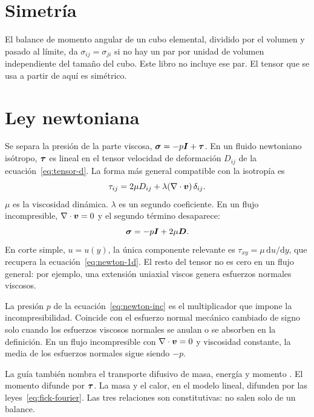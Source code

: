 \section{Simetría}

El balance de momento angular de un cubo elemental, dividido por el volumen y pasado al límite, da \(\sigma_{ij}=\sigma_{ji}\) si no hay un par por unidad de volumen independiente del tamaño del cubo. Este libro no incluye ese par. El tensor que se usa a partir de aquí es simétrico.

\section{Ley newtoniana}

Se separa la presión de la parte viscosa, \(\boldsymbol{\sigma}=-p\boldsymbol{I}+\boldsymbol{\tau}\). En un fluido newtoniano isótropo, \(\boldsymbol{\tau}\) es lineal en el tensor velocidad de deformación \(D_{ij}\) de la ecuación~\eqref{eq:tensor-d}. La forma más general compatible con la isotropía es
\begin{equation}
\label{eq:newtoniano}
\tau_{ij}=2\mu D_{ij}+\lambda (\nabla\cdot\boldsymbol{v})\,\delta_{ij}.
\end{equation}
\(\mu\) es la viscosidad dinámica. \(\lambda\) es un segundo coeficiente. En un flujo incompresible, \(\nabla\cdot\boldsymbol{v}=0\) y el segundo término desaparece:
\begin{equation}
\label{eq:newton-inc}
\boldsymbol{\sigma}=-p\boldsymbol{I}+2\mu\boldsymbol{D}.
\end{equation}
 En corte simple, \(u=u(y)\), la única componente relevante es \(\tau_{xy}=\mu\,\mathrm{d}u/\mathrm{d}y\), que recupera la ecuación~\eqref{eq:newton-1d}. El resto del tensor no es cero en un flujo general: por ejemplo, una extensión uniaxial viscos genera esfuerzos normales viscosos.

\begin{warningbox}
La presión \(p\) de la ecuación~\eqref{eq:newton-inc} es el multiplicador que impone la incompresibilidad. Coincide con el esfuerzo normal mecánico cambiado de signo solo cuando los esfuerzos viscosos normales se anulan o se absorben en la definición. En un flujo incompresible con \(\nabla\cdot\boldsymbol{v}=0\) y viscosidad constante, la media de los esfuerzos normales sigue siendo \(-p\).
\end{warningbox}

La guía también nombra el transporte difusivo de masa, energía y momento \parencite{uleGuia2026}. El momento difunde por \(\boldsymbol{\tau}\). La masa y el calor, en el modelo lineal, difunden por las leyes~\eqref{eq:fick-fourier}. Las tres relaciones son constitutivas: no salen solo de un balance.

